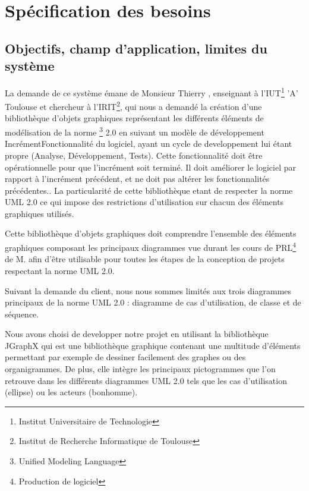 \documentclass[12pt,a4paper,openany]{report}
\begin{document}
	\maketitle
	\newpage
	\tableofcontents
	\newpage
	\chapter{Spécification des besoins}
	\section{Objectifs, champ d'application, limites du système}
	La demande de ce système émane de Monsieur Thierry , enseignant à l'IUT\footnote{Institut Universitaire de Technologie}
	'A' Toulouse et chercheur à l'IRIT\footnote{Institut de Recherche Informatique de Toulouse},
	qui nous a demandé la création d'une bibliothèque d'objets graphiques représentant
	les différents éléments de modélisation de la norme 
	\footnote{Unified Modeling Language} 2.0 en suivant un modèle de développement 
	{Incrément}{Fonctionnalité du logiciel, ayant un cycle de developpement lui étant propre (Analyse, Développement, Tests).
	Cette fonctionnalité doit être opérationnelle pour que l'incrément soit terminé. Il doit améliorer le logiciel
	par rapport à l'incrément précédent, et ne doit pas altérer les fonctionnalités précédentes.}.
	La particularité de cette bibliothèque etant de respecter la norme UML 2.0 ce qui impose des restrictions
	d'utilisation sur chacun des éléments graphiques utilisés.


	Cette bibliothèque d'objets graphiques doit comprendre l'ensemble des éléments graphiques composant
	les principaux diagrammes vue durant les cours de PRL\footnote{Production de logiciel} de M.  afin
	d'être utilisable pour toutes les étapes de la conception de projets respectant la norme UML 2.0.
	
	Suivant la demande du client, nous nous sommes limités aux trois diagrammes principaux de la norme UML 2.0 :
	diagramme de cas d'utilisation, de classe et de séquence.

	Nous avons choisi de developper notre projet en utilisant la bibliothèque JGraphX
	qui est une bibliothèque graphique contenant une multitude d'éléments permettant
	par exemple de dessiner facilement des graphes ou des organigrammes. De plus, elle intègre les principaux 
	pictogrammes que l'on retrouve dans les différents diagrammes UML 2.0 tels que les cas d'utilisation (ellipse)
	ou les acteurs (bonhomme).
\end{document}
